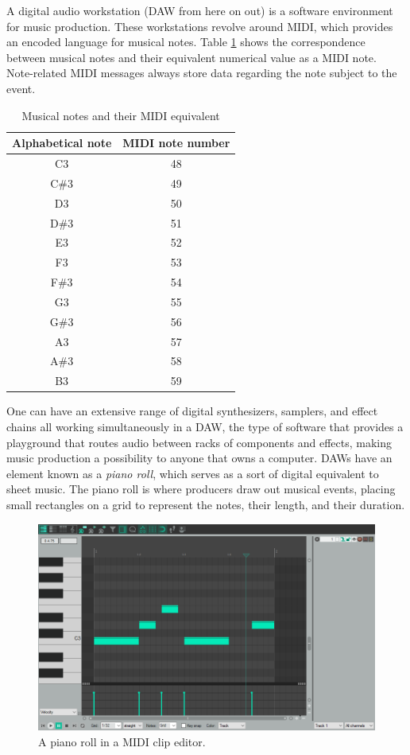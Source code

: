 \documentclass[12pt, a4paper, hidelinks]{report}
\begin{document}
	A digital audio workstation (DAW from here on out) is a software environment for music production. These workstations revolve around MIDI, which provides an encoded language for musical notes. Table \ref{table:notes}  shows the correspondence between musical notes and their equivalent numerical value as a MIDI note. Note-related MIDI messages always store data regarding the note subject to the event. 
	\par
	\begin{table}[h] 
		\centering
		\begin{tabular}{c c}
			Alphabetical note & MIDI note number\tabularnewline
			\midrule
			C3 & 48\tabularnewline
			C\#3 & 49\tabularnewline
			D3 & 50\tabularnewline
			D\#3 & 51\tabularnewline
			E3 & 52\tabularnewline
			F3 & 53\tabularnewline
			F\#3 & 54\tabularnewline
			G3 & 55\tabularnewline
			G\#3 & 56\tabularnewline
			A3 & 57\tabularnewline
			A\#3 & 58\tabularnewline
			B3 & 59\tabularnewline
		\end{tabular}
		\caption{Musical notes and their MIDI equivalent}
		\label{table:notes}
	\end{table} 
	One can have an extensive range of digital synthesizers, samplers, and effect chains all working simultaneously in a DAW, the type of software that provides a playground that routes audio between racks of components and effects, making music production a possibility to anyone that owns a computer. DAWs have an element known as a \textit{piano roll}, which serves as a sort of digital equivalent to sheet music. The piano roll is where producers draw out musical events, placing small rectangles on a grid to represent the notes, their length, and their duration.
	\begin{figure}[h]
		\centering
		\includegraphics[width=\textwidth]{u/proll.png}
		\caption{A piano roll in a MIDI clip editor.}
		\label{fig:proll}
	\end{figure}
\end{document}
